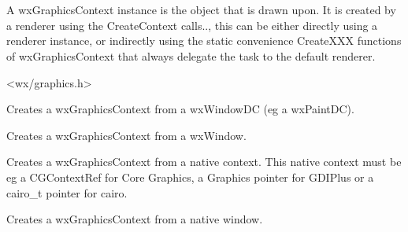 
\section{}\label{wxgraphicscontext}

A wxGraphicsContext instance is the object that is drawn upon. It is created by a renderer using the CreateContext calls.., this can be either directly using a renderer 
instance, or indirectly using the static convenience CreateXXX functions of wxGraphicsContext that always delegate the task to the default renderer.




<wx/graphics.h>


\label{wxgraphicscontextcreate}


Creates a wxGraphicsContext from a wxWindowDC (eg a wxPaintDC).


Creates a wxGraphicsContext from a wxWindow.



\label{wxgraphicscontextcreatefromnative}

Creates a wxGraphicsContext from a native context. This native context must be eg a CGContextRef for Core Graphics, a Graphics pointer for GDIPlus or a 
cairo\_t pointer for cairo.


Creates a wxGraphicsContext from a native window. 

